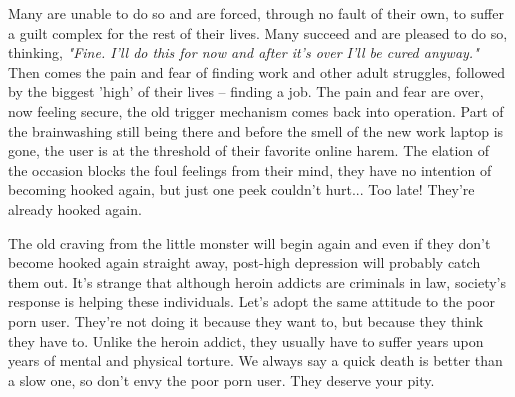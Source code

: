 \documentclass[easypeasy.tex]{subfiles}
\begin{document}
Many are unable to do so and are forced, through no fault of their own, to suffer a guilt complex for the rest of their lives. Many succeed and are pleased to do so, thinking, \textit{"Fine. I'll do this for now and after it's over I'll be cured anyway."} Then comes the pain and fear of finding work and other adult struggles, followed by the biggest 'high' of their lives -- finding a job. The pain and fear are over, now feeling secure, the old trigger mechanism comes back into operation. Part of the brainwashing still being there and before the smell of the new work laptop is gone, the user is at the threshold of their favorite online harem. The elation of the occasion blocks the foul feelings from their mind, they have no intention of becoming hooked again, but just one peek couldn't hurt... Too late! They're already hooked again.

The old craving from the little monster will begin again and even if they don't become hooked again straight away, post-high depression will probably catch them out. It's strange that although heroin addicts are criminals in law, society's response is helping these individuals. Let's adopt the same attitude to the poor porn user. They're not doing it because they want to, but because they think they have to. Unlike the heroin addict, they usually have to suffer years upon years of mental and physical torture. We always say a quick death is better than a slow one, so don't envy the poor porn user. They deserve your pity.
\end{document}
